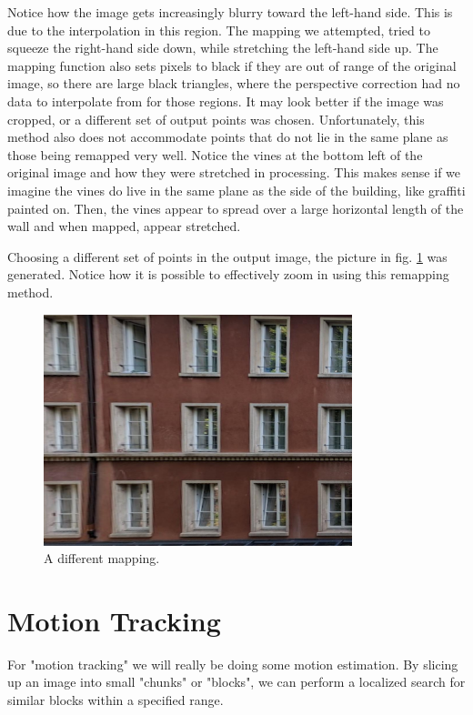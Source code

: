\documentclass[11pt,a4paper]{article}
\begin{document}
\clearpage

Notice how the image gets increasingly blurry toward the left-hand side. This is due to the interpolation in this region. The mapping we attempted, tried to squeeze the right-hand side down, while stretching the left-hand side up. The mapping function also sets pixels to black if they are out of range of the original image, so there are large black triangles, where the perspective correction had no data to interpolate from for those regions. It may look better if the image was cropped, or a different set of output points was chosen. Unfortunately, this method also does not accommodate points that do not lie in the same plane as those being remapped very well. Notice the vines at the bottom left of the original image and how they were stretched in processing. This makes sense if we imagine the vines do live in the same plane as the side of the building, like graffiti painted on. Then, the vines appear to spread over a large horizontal length of the wall and when mapped, appear stretched.

Choosing a different set of points in the output image, the picture in fig. \ref{fig:map2} was generated. Notice how it is possible to effectively zoom in using this remapping method.

\begin{figure}[ht]
	\centering
	\includegraphics[width=0.8\textwidth]{out2}
	\caption{A different mapping.}
	\label{fig:map2}
\end{figure}

\pagebreak

\section{Motion Tracking}
For "motion tracking" we will really be doing some motion estimation. By slicing up an image into small "chunks" or "blocks", we can perform a localized search for similar blocks within a specified range. 
\end{document}
